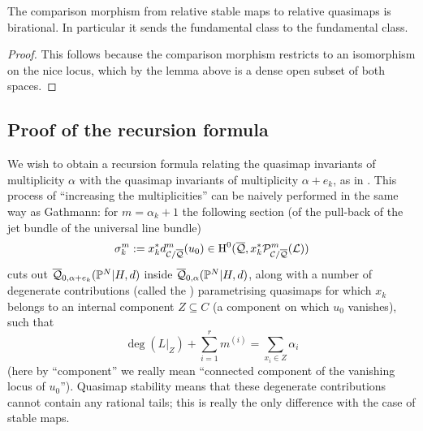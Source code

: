 \begin{cor} \label{Comparison morphism birational} The comparison morphism from relative stable maps to relative quasimaps is birational. In particular it sends the fundamental class to the fundamental class. \end{cor}
\begin{proof} This follows because the comparison morphism restricts to an isomorphism on the nice locus, which by the lemma above is a dense open subset of both spaces. \end{proof}


\subsection{Proof of the recursion formula} \label{Subsection recursion formula for PN}
We wish to obtain a recursion formula relating the quasimap invariants of multiplicity $\alpha$ with the quasimap invariants of multiplicity $\alpha + e_k$, as in \cite[Theorem 2.6]{Ga}. This process of ``increasing the multiplicities'' can be naively performed in the same way as Gathmann: for $m = \alpha_k + 1$ the following section (of the pull-back of the jet bundle of the universal line bundle)
\[
\sigma^m_k:=x_k^*d^m_{\mathcal C/\overline{\mathcal Q}}(u_0)\in \operatorname{H}^0(\overline{\mathcal Q},x_k^*\mathcal P^m_{\mathcal C/\overline{\mathcal Q}}(\mathcal L))
\]
cuts out $\overline{\mathcal Q}_{0,\alpha+e_k}(\mathbb P^N|H,d)$ inside $\overline{\mathcal Q}_{0,\alpha}(\mathbb P^N|H,d)$, along with a number of degenerate contributions (called the ) parametrising quasimaps for which $x_k$ belongs to an internal component $Z \subseteq C$ (a component on which $u_0$ vanishes), such that
\begin{equation*}\deg(L|_{Z})+\sum_{i=1}^r m^{(i)}=\sum_{x_i\in Z}\alpha_i \end{equation*}
(here by ``component'' we really mean ``connected component of the vanishing locus of $u_0$''). Quasimap stability means that these degenerate contributions cannot contain any rational tails; this is really the only difference with the case of stable maps.

